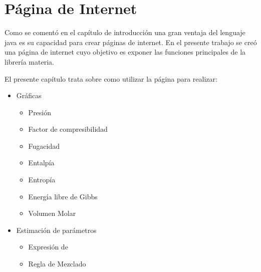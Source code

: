 \chapter{Página de Internet}\label{chap:webpage}

	Como se comentó en el capítulo de introducción una gran ventaja del lenguaje java es su capacidad para crear páginas de internet. En el presente trabajo se creó una página de internet cuyo objetivo es exponer las funciones principales de la librería materia.

	El presente capítulo trata sobre como utilizar la página para realizar:

	\begin{itemize}
		\item{Gráficas}
		\begin{itemize}
			\item Presión
			\item Factor de compresibilidad
			\item Fugacidad
			\item Entalpía
			\item Entropía
			\item Energía libre de Gibbs
			\item Volumen Molar
		\end{itemize}
		\item{Estimación de parámetros}
		\begin{itemize}
			\item Expresión de \alpha
			\item Regla de Mezclado
		\end{itemize}
	\end{itemize}
